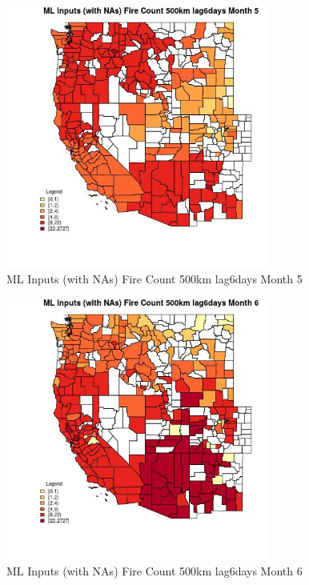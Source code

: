 \begin{figure} 
\centering  
\includegraphics[width=0.77\textwidth]{Code_Outputs/Report_ML_input_PM25_Step4_part_f_de_duplicated_aveswNAs_CountyFire_Count_500km_lag6daysmedianMonth5.jpg} 
\caption{\label{fig:Report_ML_input_PM25_Step4_part_f_de_duplicated_aveswNAsCountyFire_Count_500km_lag6daysmedianMonth5}ML Inputs (with NAs) Fire Count 500km lag6days Month 5} 
\end{figure} 
 

\begin{figure} 
\centering  
\includegraphics[width=0.77\textwidth]{Code_Outputs/Report_ML_input_PM25_Step4_part_f_de_duplicated_aveswNAs_CountyFire_Count_500km_lag6daysmedianMonth6.jpg} 
\caption{\label{fig:Report_ML_input_PM25_Step4_part_f_de_duplicated_aveswNAsCountyFire_Count_500km_lag6daysmedianMonth6}ML Inputs (with NAs) Fire Count 500km lag6days Month 6} 
\end{figure} 
 

